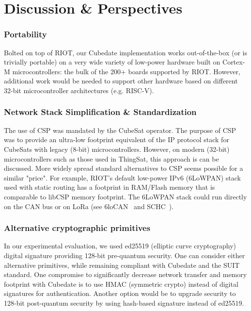 \fi


\section{Discussion \& Perspectives}

\subsubsection{Portability} Bolted on top of RIOT, our Cubedate implementation works out-of-the-box
(or is trivially portable) on a very wide variety of low-power hardware built on Cortex-M microcontrollers:
the bulk of the 200+ boards supported by RIOT. However, additional work would be needed to support
other hardware based on different 32-bit microcontroller architectures (e.g. RISC-V).

\subsubsection{Network Stack Simplification \& Standardization}
The use of CSP was mandated by the CubeSat operator. The purpose of CSP was to provide an ultra-low
footprint equivalent of the IP protocol stack for CubeSats with legacy (8-bit) microcontrollers.
However, on modern (32-bit) microcontrollers such as those used in ThingSat, this approach is can be discussed.
More widely spread standard alternatives to CSP seems possible for a similar "price".
For example, RIOT's default low-power IPv6 (6LoWPAN) stack used with static routing has a footprint
in RAM/Flash memory that is comparable to libCSP memory footprint. The 6LoWPAN stack
could run directly on the CAN bus or on LoRa (see 6loCAN~\cite{wachter20206locan01}
and SCHC~\cite{rfc8724}).

\subsubsection{Alternative cryptographic primitives}
In our experimental evaluation, we used ed25519 (elliptic curve cryptography) digital signature
providing 128-bit pre-quantum security. One can consider either alternative primitives, while
remaining compliant with Cubedate and the SUIT standard. One compromise to significantly decrease
network transfer and memory footprint with Cubedate is to use HMAC (symmetric crypto) instead of
digital signatures for authentication. Another option would be to upgrade security to 128-bit
post-quantum security by using hash-based signature instead of ed25519.
